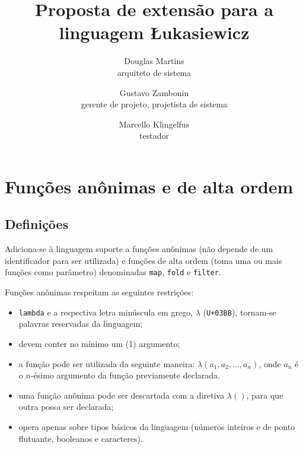 \documentclass{sftex/sftex}
\title{Proposta de extensão para a linguagem Łukasiewicz}
\author{
    Douglas Martins \\ {\small arquiteto de sistema}
    \and Gustavo Zambonin \\ {\small gerente de projeto, projetista de sistema}
    \and Marcello Klingelfus \\ {\small testador} \vspace{2mm} \\
}
\newenvironment{smallitem}{
    \vspace{-1mm}
    \begin{itemize}
    \setlength{\parskip}{0pt}
    \setlength{\itemsep}{2pt}
}{
    \vspace{-2mm}
    \end{itemize}
}
\begin{document}
\maketitle

\section{Funções anônimas e de alta ordem}

\subsection{Definições}

Adiciona-se à linguagem suporte a funções anônimas (não depende de um
identificador para ser utilizada) e funções de alta ordem (toma uma ou mais
funções como parâmetro) denominadas \verb!map!, \verb!fold! e
\verb!filter!. \medskip

Funções anônimas respeitam as seguintes restrições:
\begin{smallitem}
    \item \verb!lambda! e a respectiva letra minúscula em grego,
        $\lambda$ (\verb!U+03BB!), tornam-se palavras reservadas da linguagem;
    \item devem conter no mínimo um (1) argumento;
    \item a função pode ser utilizada da seguinte maneira:
        \texttt{$\lambda(a_1, a_2, \ldots, a_n)$}, onde $a_n$ é o
        $n$-ésimo argumento da função previamente declarada.
    \item uma função anônima pode ser descartada com a diretiva
        \texttt{$\lambda()$}, para que outra possa ser declarada;
    \item opera apenas sobre tipos básicos da linguagem (números inteiros
        e de ponto flutuante, booleanos e caracteres).
\end{smallitem}
\end{document}
